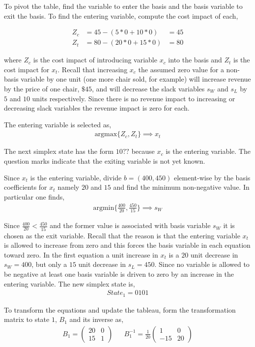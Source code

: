 To pivot the table, find the variable to enter the basis and the basis variable to exit the basis. To find the entering variable, compute the cost impact of each,

\begin{align*}
Z_c &= 45 - (5*0 + 10*0) &= 45\\
Z_t &= 80 - (20*0 + 15*0) &= 80
\end{align*}

where $Z_c$ is the cost impact of introducing variable $x_c$ into the basis and $Z_t$ is the cost impact for $x_t$. Recall that increasing $x_c$ the assumed zero value for a non-basis variable by one unit (one more chair sold, for example) will increase revenue by the price of one chair, $\$45$, and will decrease the slack variables $s_W$ and $s_L$ by $5$ and $10$ units respectively. Since there is no revenue impact to increasing or decreasing slack variables the revenue impact is zero for each. 

The entering variable is selected as,
\begin{align*}
\text{argmax}\{Z_c, Z_t\} \implies x_t
\end{align*}

The next simplex state has the form $10??$ because $x_c$ is the entering variable. The question marks indicate that the exiting variable is not yet known.

Since $x_t$ is the entering variable, divide $b = (400, 450)$ element-wise by the basis coefficients for $x_t$ namely $20$ and $15$ and find the minimum non-negative value. In particular one finds,
\begin{align*}
\text{argmin}\{\frac{400}{20}, \frac{450}{15}\} \implies s_W
\end{align*}

Since $\frac{400}{20} < \frac{450}{15}$ and the former value is associated with basis variable $s_W$ it is chosen as the exit variable. Recall that the reason is that the entering variable $x_t$ is allowed to increase from zero and this forces the basis variable in each equation toward zero. In the first equation a unit increase in $x_t$ is a $20$ unit decrease in $s_W = 400$, but only a $15$ unit decrease in $s_L = 450$. Since no variable is allowed to be negative at least one basis variable is driven to zero by an increase in the entering variable. The new simplex state is,
\begin{align*}
State_1 = 0101
\end{align*}

To transform the equations and update the tableau, form the transformation matrix to state $1$,  $B_1$ and its inverse as,
\begin{align*}
B_1 = \begin{pmatrix}20&0\\15&1\end{pmatrix} && B_1^{-1} = \frac{1}{20}\begin{pmatrix}1&0\\-15&20\end{pmatrix}
\end{align*}

